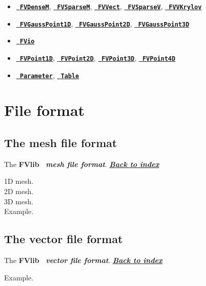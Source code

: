 \documentclass[12pt]{book}
\newcommand{\Index}[0]{{\bf \sl{\color{DodgerBlue} Back to index}}}
\newcommand{\Format}[1]{{\bf \sl{\color{Olive} #1}}}
\newcommand{\Class}[1]{{\bf \tt{\color{magenta} #1}}}
\newcommand{\FVlib}{{\bf FVlib}}
\begin{document}
\begin{itemize}
\item \hyperref[FVDenseM]{\Class{FVDenseM}}, \hyperref[FVSparseM]{\Class{FVSparseM}},
\hyperref[FVVect]{\Class{FVVect}},  \hyperref[FVSparseV]{\Class{FVSparseV}}, \hyperref[FVKrylov]{\Class{FVVKrylov}}
\end{itemize}

\begin{itemize}
\item \hyperref[FVGaussPoint1D]{\Class{FVGaussPoint1D}},
\hyperref[FVGaussPoint2D]{\Class{FVGaussPoint2D}},
\hyperref[FVGaussPoint3D]{\Class{FVGaussPoint3D}}
\item \hyperref[FVio]{\Class{FVio}}
\item \hyperref[FVPoint1D]{\Class{FVPoint1D}}, \hyperref[FVPoint2D]{\Class{FVPoint2D}}, 
\hyperref[FVPoint3D]{\Class{FVPoint3D}},  \hyperref[FVPoint4D]{\Class{FVPoint4D}}
\item \hyperref[Parameter]{\Class{Parameter}}, \hyperref[Table]{\Class{Table}}
\end{itemize}
\chapter{File format}
\newpage
\section{The mesh file format}\label{MeshFormat}
\begin{Description*}
The \FVlib\ \Format{mesh file format}.
\hfill \hyperref[MainIndex]{\Index}
\end{Description*}
{\headline 1D mesh.}\\[5pt]

{\headline 2D mesh.}\\[5pt]

{\headline 3D mesh.}\\[5pt]

{\headline Example.}
\newpage
\section{The vector file format}\label{VectorFormat}
\begin{Description*}
The \FVlib\ \Format{vector file format}.
\hfill \hyperref[MainIndex]{\Index}
\end{Description*}

{\headline Example.}
\newpage
\end{document}
